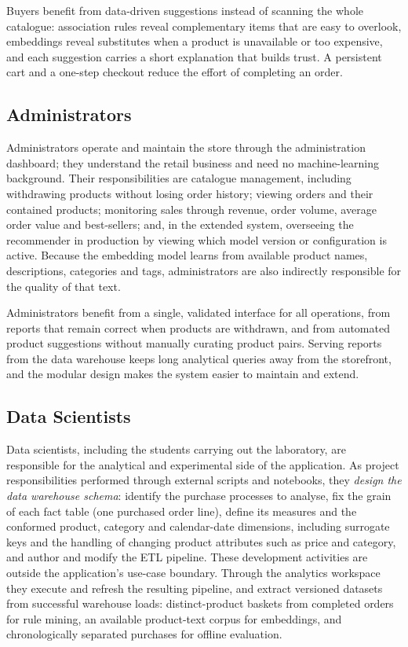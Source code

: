 \documentclass[a4paper,12pt]{article}
\begin{document}
Buyers benefit from data-driven suggestions instead of scanning the whole catalogue: association
rules reveal complementary items that are easy to overlook, embeddings reveal substitutes when a
product is unavailable or too expensive, and each suggestion carries a short explanation that
builds trust. A persistent cart and a one-step checkout reduce the effort of completing an order.

\subsection{Administrators}

Administrators operate and maintain the store through the administration dashboard; they understand
the retail business and need no machine-learning background. Their responsibilities are catalogue
management, including withdrawing products without losing order history; viewing orders and their
contained products; monitoring sales through
revenue, order volume, average order value and best-sellers; and, in the extended system, overseeing
the recommender in production by viewing which model version or configuration is active. Because
the embedding model learns from available product names, descriptions, categories and tags,
administrators are also indirectly responsible for the quality of that text.

Administrators benefit from a single, validated interface for all operations, from reports that
remain correct when products are withdrawn, and from automated product suggestions without manually
curating product pairs. Serving reports from the data warehouse keeps long analytical queries away from the
storefront, and the modular design makes the system easier to maintain and extend.

\subsection{Data Scientists}

Data scientists, including the students carrying out the laboratory, are responsible for the
analytical and experimental side of the application. As project responsibilities performed through
external scripts and notebooks, they \emph{design the data
warehouse schema}: identify the purchase processes to analyse, fix the grain of each fact table
(one purchased order line), define its measures and the conformed product, category and calendar-date
dimensions, including surrogate keys and the handling of changing product attributes such as price
and category, and author and modify the ETL pipeline. These development activities are outside the
application's use-case boundary. Through the analytics workspace they execute and refresh the
resulting pipeline, and extract versioned datasets from successful warehouse loads: distinct-product
baskets from completed orders for rule mining, an available product-text corpus for embeddings, and
chronologically separated purchases for offline evaluation.
\end{document}
